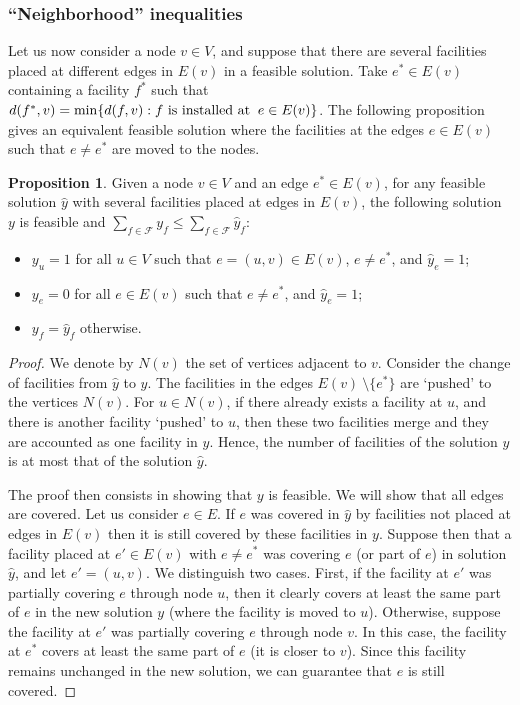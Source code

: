 \documentclass[review]{elsarticle}
\newcommand{\cF}{{\mathcal F}}
\theoremstyle{definition}
\newtheorem{proposition}{Proposition}[section]
\begin{document}
\subsubsection*{``Neighborhood'' inequalities}
Let us now consider a node $v\in V$, and suppose that there are several facilities placed at different edges in $E(v)$ in a feasible solution. Take $e^*\in E(v)$ containing a facility $f^*$ such that $d(f^*,v)=\min \{d(f,v): f \textup{ is installed at }\:e\in E(v)\}$. The following proposition gives an equivalent feasible solution where the facilities at the edges $e\in E(v)$ such that $e\neq e^*$ are moved to the nodes.
\begin{proposition}\label{lemma:ineq}
Given a node $v \in V$ and an edge $e^* \in E(v)$, for any feasible solution $\hat{y}$ with several facilities placed at edges in $E(v)$, the following solution $y$ is feasible and $\sum_{f \in \cF} y_f \le \sum_{f \in \cF} \hat{y}_f$:
\begin{itemize}
	\item $y_{u}=1$ for all $u\in V$ such that $e=(u,v)\in E(v)$, $e \neq e^*$, and $\hat{y}_e=1$;
	\item $y_{e}=0$ for all $e\in E(v)$ such that $e \neq e^*$, and $\hat{y}_e=1$;
	\item $y_f=\hat{y}_f$ otherwise.
\end{itemize}
\end{proposition}
\begin{proof}
We denote by $N(v)$ the set of vertices adjacent to $v$. Consider the change of facilities from $\hat{y}$ to $y$. The facilities in the edges $E(v) \ \setminus \{e^*\}$ are `pushed' to the vertices $N(v)$. For $u \in N(v)$, if there already exists a facility at $u$, and there is another facility `pushed' to $u$, then these two facilities merge and they are accounted as one facility in  $y$. Hence, the number of facilities of the solution $y$ is at most that of the solution $\hat{y}$.

The proof then consists in showing that $y$ is feasible. We will show that all edges are covered. Let us consider $e\in E$. If $e$ was covered in $\hat{y}$ by facilities not placed at edges in $E(v)$ then it is still covered by these facilities in $y$. Suppose then that a facility placed at $e'\in E(v)$ with $e\neq e^*$ was covering $e$ (or part of $e$) in solution $\hat{y}$, and let $e'=(u,v)$. We distinguish two cases. First, if the facility at $e'$ was partially covering $e$ through node $u$, then it clearly covers at least the same part of $e$ in the new solution $y$ (where the facility is moved to $u$). Otherwise, suppose the facility at $e'$ was partially covering $e$ through node $v$. In this case, the facility at $e^*$ covers at least the same part of $e$ (it is closer to $v$). Since this facility remains unchanged in the new solution, we can guarantee that $e$ is still covered.
\end{proof}
\end{document}
